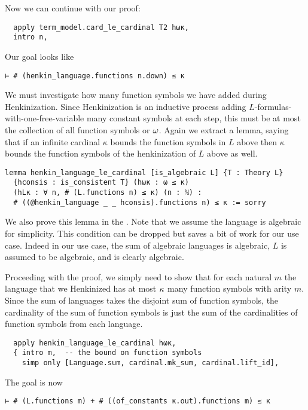 Now we can continue with our proof:

\begin{lstlisting}
  apply term_model.card_le_cardinal T2 hωκ,
  intro n, \end{lstlisting}

Our goal looks like
\begin{lstlisting}
⊢ # (henkin_language.functions n.down) ≤ κ \end{lstlisting}

We must investigate how many function symbols we have added
during Henkinization.
Since Henkinization is an inductive process adding
$L$-formulas-with-one-free-variable many constant symbols at
each step, this must be at most the collection of all function symbols
or $\omega$.
Again we extract a lemma,
saying that if an infinite cardinal $\kappa$ bounds the
function symbols in $L$ above then
$\kappa$ bounds the function symbols of the henkinization of $L$
above as well.

\begin{lstlisting}
lemma henkin_language_le_cardinal [is_algebraic L] {T : Theory L}
  {hconsis : is_consistent T} (hωκ : ω ≤ κ)
  (hLκ : ∀ n, # (L.functions n) ≤ κ) (n : ℕ) :
  # ((@henkin_language _ _ hconsis).functions n) ≤ κ := sorry \end{lstlisting}

We also prove this lemma in the .
Note that we assume the language is algebraic for simplicity.
This condition can be dropped but saves a bit of work for our use case.
Indeed in our use case, the sum of algebraic languages is algebraic,
$L$ is assumed to be algebraic, and 
is clearly algebraic.

Proceeding with the proof, we simply need to show that
for each natural $m$
the language that we Henkinized has at most $\kappa$ many function symbols
with arity $m$.
Since the sum of languages takes the disjoint sum of function symbols,
the cardinality of the sum of function symbols is just the sum of
the cardinalities of function symbols from each language.

\begin{lstlisting}
  apply henkin_language_le_cardinal hωκ,
  { intro m,  -- the bound on function symbols
    simp only [Language.sum, cardinal.mk_sum, cardinal.lift_id], \end{lstlisting}

The goal is now

\begin{lstlisting}
⊢ # (L.functions m) + # ((of_constants κ.out).functions m) ≤ κ \end{lstlisting}

